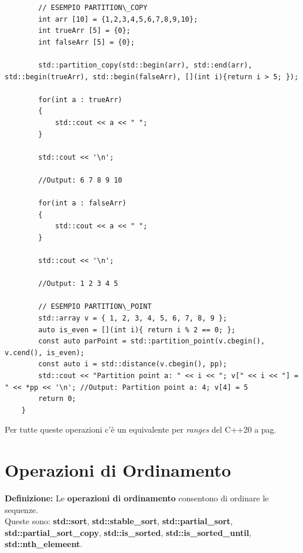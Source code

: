 \begin{lstlisting}
		// ESEMPIO PARTITION\_COPY
		int arr [10] = {1,2,3,4,5,6,7,8,9,10};
		int trueArr [5] = {0};
		int falseArr [5] = {0};
		
		std::partition_copy(std::begin(arr), std::end(arr), std::begin(trueArr), std::begin(falseArr), [](int i){return i > 5; });
		
		for(int a : trueArr)
		{
			std::cout << a << " ";
		}
		
		std::cout << '\n';
		
		//Output: 6 7 8 9 10
		
		for(int a : falseArr)
		{
			std::cout << a << " ";
		}
		
		std::cout << '\n';
		
		//Output: 1 2 3 4 5
		
		// ESEMPIO PARTITION\_POINT
		std::array v = { 1, 2, 3, 4, 5, 6, 7, 8, 9 };
		auto is_even = [](int i){ return i % 2 == 0; };
		const auto parPoint = std::partition_point(v.cbegin(), v.cend(), is_even);
		const auto i = std::distance(v.cbegin(), pp);
		std::cout << "Partition point a: " << i << "; v[" << i << "] = " << *pp << '\n'; //Output: Partition point a: 4; v[4] = 5
		return 0;
	}
\end{lstlisting}

\fleuron

\textsf{\small Per tutte queste operazioni c'è un equivalente per \emph{ranges} del C++20 a pag. \pageref{ranges}} \\


\newpage

\section{Operazioni di Ordinamento}

\textsf{\small \textbf{Definizione: } Le \textbf{operazioni di ordinamento} consentono di ordinare le sequenze.} \\

\textsf{\small Queste sono: \textbf{std::sort}, \textbf{std::stable\_sort}, \textbf{std::partial\_sort}, \textbf{std::partial\_sort\_copy}, \textbf{std::is\_sorted}, \textbf{std::is\_sorted\_until}, \textbf{std::nth\_elemeent}.} \\

